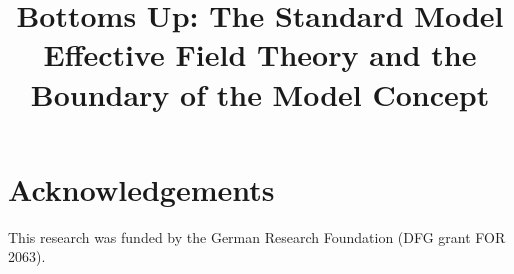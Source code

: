 \documentclass[letterpaper]{article}
\title{Bottoms Up: The Standard Model Effective Field Theory and the Boundary of the Model Concept}
\author{}%
\date{}
\begin{document}
\maketitle
















\section{Acknowledgements}
This research was funded by the German Research Foundation (DFG grant FOR 2063). 



\end{document}
